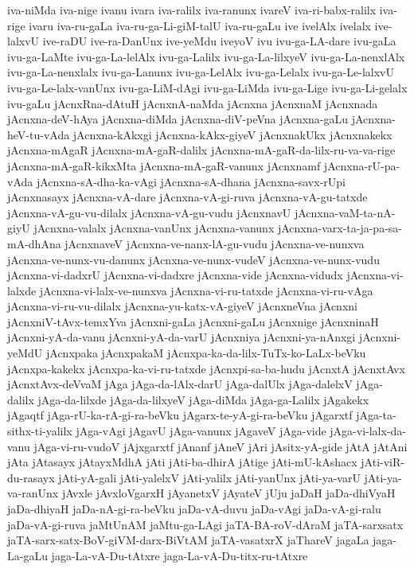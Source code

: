 {iva-niMda
iva-nige
ivanu
ivara
iva-ralilx
iva-ranunx
ivareV
iva-ri-babx-ralilx
iva-rige
ivaru
iva-ru-gaLa
iva-ru-ga-Li-giM-talU
iva-ru-gaLu
ive
ivelAlx
ivelalx
ive-lalxvU
ive-raDU
ive-ra-DanUnx
ive-yeMdu
iveyoV
ivu
ivu-ga-LA-dare
ivu-gaLa
ivu-ga-LaMte
ivu-ga-La-lelAlx
ivu-ga-Lalilx
ivu-ga-La-lilxyeV
ivu-ga-La-nenxlAlx
ivu-ga-La-nenxlalx
ivu-ga-Lanunx
ivu-ga-LelAlx
ivu-ga-Lelalx
ivu-ga-Le-lalxvU
ivu-ga-Le-lalx-vanUnx
ivu-ga-LiM-dAgi
ivu-ga-LiMda
ivu-ga-Lige
ivu-ga-Li-gelalx
ivu-gaLu
jAcnxRna-dAtuH
jAcnxnA-naMda
jAcnxna
jAcnxnaM
jAcnxnada
jAcnxna-deV-hAya
jAcnxna-diMda
jAcnxna-diV-peVna
jAcnxna-gaLu
jAcnxna-heV-tu-vAda
jAcnxna-kAkxgi
jAcnxna-kAkx-giyeV
jAcnxnakUkx
jAcnxnakekx
jAcnxna-mAgaR
jAcnxna-mA-gaR-dalilx
jAcnxna-mA-gaR-da-lilx-ru-va-va-rige
jAcnxna-mA-gaR-kikxMta
jAcnxna-mA-gaR-vanunx
jAcnxnamf
jAcnxna-rU-pa-vAda
jAcnxna-sA-dha-ka-vAgi
jAcnxna-sA-dhana
jAcnxna-savx-rUpi
jAcnxnasayx
jAcnxna-vA-dare
jAcnxna-vA-gi-ruva
jAcnxna-vA-gu-tatxde
jAcnxna-vA-gu-vu-dilalx
jAcnxna-vA-gu-vudu
jAcnxnavU
jAcnxna-vaM-ta-nA-giyU
jAcnxna-valalx
jAcnxna-vanUnx
jAcnxna-vanunx
jAcnxna-varx-ta-ja-pa-sa-mA-dhAna
jAcnxnaveV
jAcnxna-ve-nanx-lA-gu-vudu
jAcnxna-ve-nunxva
jAcnxna-ve-nunx-vu-danunx
jAcnxna-ve-nunx-vudeV
jAcnxna-ve-nunx-vudu
jAcnxna-vi-dadxrU
jAcnxna-vi-dadxre
jAcnxna-vide
jAcnxna-vidudx
jAcnxna-vi-lalxde
jAcnxna-vi-lalx-ve-nunxva
jAcnxna-vi-ru-tatxde
jAcnxna-vi-ru-vAga
jAcnxna-vi-ru-vu-dilalx
jAcnxna-yu-katx-vA-giyeV
jAcnxneVna
jAcnxni
jAcnxniV-tAvx-temxYva
jAcnxni-gaLa
jAcnxni-gaLu
jAcnxnige
jAcnxninaH
jAcnxni-yA-da-vanu
jAcnxni-yA-da-varU
jAcnxniya
jAcnxni-ya-nAnxgi
jAcnxni-yeMdU
jAcnxpaka
jAcnxpakaM
jAcnxpa-ka-da-lilx-TuTx-ko-LaLx-beVku
jAcnxpa-kakekx
jAcnxpa-ka-vi-ru-tatxde
jAcnxpi-sa-ba-hudu
jAcnxtA
jAcnxtAvx
jAcnxtAvx-deVvaM
jAga
jAga-da-lAlx-darU
jAga-dalUlx
jAga-dalelxV
jAga-dalilx
jAga-da-lilxde
jAga-da-lilxyeV
jAga-diMda
jAga-ga-Lalilx
jAgakekx
jAgaqtf
jAga-rU-ka-rA-gi-ra-beVku
jAgarx-te-yA-gi-ra-beVku
jAgarxtf
jAga-ta-sithx-ti-yalilx
jAga-vAgi
jAgavU
jAga-vanunx
jAgaveV
jAga-vide
jAga-vi-lalx-da-vanu
jAga-vi-ru-vudoV
jAjxgarxtf
jAnanf
jAneV
jAri
jAsitx-yA-gide
jAtA
jAtAni
jAta
jAtasayx
jAtayxMdhA
jAti
jAti-ba-dhirA
jAtige
jAti-mU-kAshacx
jAti-viR-du-rasayx
jAti-yA-gali
jAti-yalelxV
jAti-yalilx
jAti-yanUnx
jAti-ya-varU
jAti-ya-va-ranUnx
jAvxle
jAvxloVgarxH
jAyanetxV
jAyateV
jUju
jaDaH
jaDa-dhiVyaH
jaDa-dhiyaH
jaDa-nA-gi-ra-beVku
jaDa-vA-duvu
jaDa-vAgi
jaDa-vA-gi-ralu
jaDa-vA-gi-ruva
jaMtUnAM
jaMtu-ga-LAgi
jaTA-BA-roV-dAraM
jaTA-sarxsatx
jaTA-sarx-satx-BoV-giVM-darx-BiVtAM
jaTA-vasatxrX
jaThareV
jagaLa
jaga-La-gaLu
jaga-La-vA-Du-tAtxre
jaga-La-vA-Du-titx-ru-tAtxre
}

